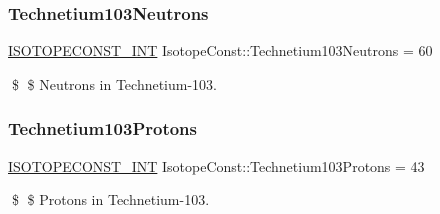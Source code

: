 \subsubsection{\texorpdfstring{Technetium103\+Neutrons}{Technetium103Neutrons}}
{\footnotesize\ttfamily \mbox{\hyperlink{group___isotope_const-_macros_ga5f18360b3e99483a35c32d789e62621c}{I\+S\+O\+T\+O\+P\+E\+C\+O\+N\+S\+T\+\_\+\+I\+NT}} Isotope\+Const\+::\+Technetium103\+Neutrons = 60}

\$ \$ Neutrons in Technetium-\/103. \mbox{\label{group___isotope_const-_technetium-_tc103_ga1bf1863039933e9c811da2101daa00bb}} 
\subsubsection{\texorpdfstring{Technetium103\+Protons}{Technetium103Protons}}
{\footnotesize\ttfamily \mbox{\hyperlink{group___isotope_const-_macros_ga5f18360b3e99483a35c32d789e62621c}{I\+S\+O\+T\+O\+P\+E\+C\+O\+N\+S\+T\+\_\+\+I\+NT}} Isotope\+Const\+::\+Technetium103\+Protons = 43}

\$ \$ Protons in Technetium-\/103. 